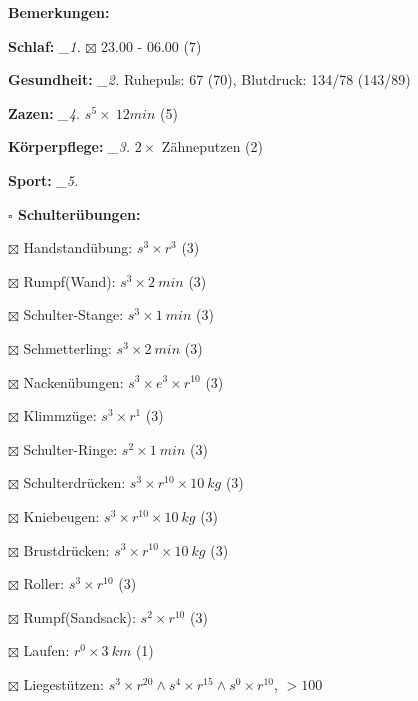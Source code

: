 \documentclass[10pt,a4paper]{article}
\newcommand\prop[1] {{\color {alizarin} {\bf #1}}}        %
\newcommand\mand[1] {{\color {burntorange} {\bf #1}}}     %
\newcommand\topspace{\vskip -15pt \hskip 20pt}
\newcommand\n[1] { {\sl #1.} \hskip 5pt }
\begin{document}
\begin{mdframed}[style=daystyle]
  \begin{labeling}{{\mand {Bemerkungen:}}}
    \setlength\itemsep{-3pt}
  \item[{\mand {Schlaf:}}]        \n{\_1} $\boxtimes$ 23.00 - 06.00 (7)
  \item[{\mand {Gesundheit:}}]    \n{\_2} Ruhepuls: 67 (70), Blutdruck: 134/78 (143/89)
  \item[{\mand {Zazen:}}]         \n{\_4} $s^5 \times\ 12 min$ (5)
  \item[{\mand {Körperpflege:}}]  \n{\_3} $2 \times$ Zähneputzen (2)
  \item[{\mand {Sport:}}]         \n{\_5}
    \topspace
    \begin{minipage}{0.75\textwidth}  
      \begin{labeling}{\prop {$\square$ {Schulterübungen:}}} 
        \setlength\itemsep{-3pt}
      \item[$\boxtimes$ Handstandübung:]  $s^3 \times r^{3}$ (3)
      \item[$\boxtimes$ Rumpf(Wand):]     $s^3 \times 2\ min$ (3)
      \item[$\boxtimes$ Schulter-Stange:] $s^3 \times 1\ min$ (3)
      \item[$\boxtimes$ Schmetterling:]   $s^3 \times 2\ min$ (3)
      \item[$\boxtimes$ Nackenübungen:]   $s^3 \times e^3 \times r^{10}$ (3)
      \item[$\boxtimes$ Klimmzüge:]       $s^3 \times r^1$ (3)
      \item[$\boxtimes$ Schulter-Ringe:]  $s^2 \times 1\ min$ (3)
      \item[$\boxtimes$ Schulterdrücken:] $s^3 \times r^{10} \times 10\ kg$ (3)
      \item[$\boxtimes$ Kniebeugen:]      $s^3 \times r^{10} \times 10\ kg$ (3)
      \item[$\boxtimes$ Brustdrücken:]    $s^3 \times r^{10} \times 10\ kg$ (3)
      \item[$\boxtimes$ Roller:]          $s^3 \times r^{10}$ (3)
      \item[$\boxtimes$ Rumpf(Sandsack):] $s^2 \times r^{10}$ (3)
      \item[$\boxtimes$ Laufen:]          $r^0 \times 3\ km$ (1)
      \item[$\boxtimes$ Liegestützen:]    $s^3 \times r^{20} \land s^4 \times r^{15} \land s^0 \times r^{10}$, $> 100$
      \end{labeling}
    \end{minipage}

\end{labeling}
\end{mdframed}
\end{document}
